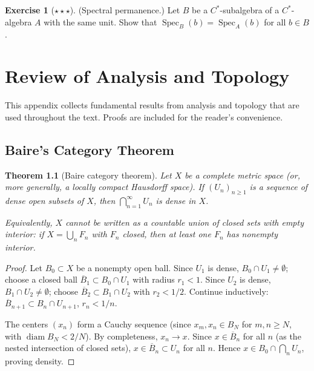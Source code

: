 \documentclass[a4paper,12pt]{book}
\DeclareMathOperator{\Spec}{Spec}
\DeclareMathOperator{\diam}{diam}
\theoremstyle{definition}
\newtheorem{exercise}{Exercise}[chapter]
\theoremstyle{plain}
\newtheorem{theorem}[definition]{Theorem}
\theoremstyle{remark}
\begin{document}
\begin{exercise}[$\star\star\star$]\label{exo:spectral-permanence}
(Spectral permanence.) Let $B$ be a $C^*$-subalgebra of a $C^*$-algebra $A$
with the same unit. Show that $\Spec_B(b) = \Spec_A(b)$ for all $b \in B$.
\end{exercise}



\appendix
\chapter{Review of Analysis and Topology}\label{app:review}
\minitoc


This appendix collects fundamental results from analysis and topology that are
used throughout the text. Proofs are included for the reader's convenience.

\section{Baire's Category Theorem}\label{sec:baire}


\begin{theorem}[Baire category theorem]\label{thm:baire}
Let $X$ be a complete metric space (or, more generally, a locally compact
Hausdorff space). If $(U_n)_{n \ge 1}$ is a sequence of dense open subsets of
$X$, then $\bigcap_{n=1}^\infty U_n$ is dense in $X$.

Equivalently, $X$ cannot be written as a countable union of closed sets with
empty interior: if $X = \bigcup_n F_n$ with $F_n$ closed, then at least one
$F_n$ has nonempty interior.
\end{theorem}

\begin{proof}
Let $B_0 \subset X$ be a nonempty open ball. Since $U_1$ is dense,
$B_0 \cap U_1 \ne \emptyset$; choose a closed ball
$\overline{B}_1 \subset B_0 \cap U_1$ with radius $r_1 < 1$. Since $U_2$
is dense, $B_1 \cap U_2 \ne \emptyset$; choose $\overline{B}_2 \subset B_1 \cap U_2$
with $r_2 < 1/2$. Continue inductively: $\overline{B}_{n+1} \subset B_n \cap U_{n+1}$,
$r_n < 1/n$.

The centers $(x_n)$ form a Cauchy sequence (since $x_m, x_n \in B_N$ for
$m, n \ge N$, with $\diam B_N < 2/N$). By completeness, $x_n \to x$.
Since $x \in \overline{B}_n$ for all $n$ (as the nested intersection of closed
sets), $x \in \overline{B}_n \subset U_n$ for all $n$. Hence
$x \in B_0 \cap \bigcap_n U_n$, proving density.
\end{proof}
\end{document}
